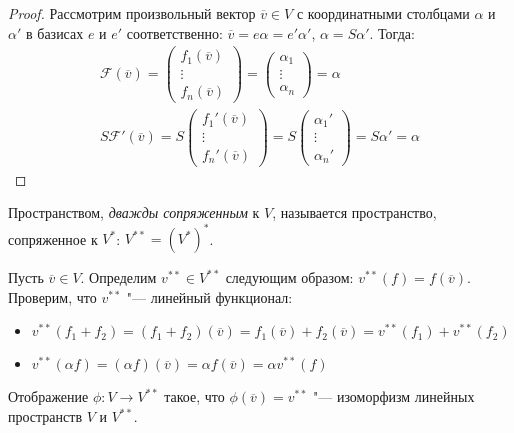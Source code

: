 \begin{proof}
	Рассмотрим произвольный вектор $\overline{v} \in V$ с координатными столбцами $\alpha$ и $\alpha'$ в базисах $e$ и $e'$ соответственно: $\overline{v} = e\alpha = e'\alpha'$, $\alpha = S\alpha'$. Тогда:
	\begin{gather*}
	\mathcal{F}(\overline{v}) = \begin{pmatrix}f_1(\overline{v})\\\vdots\\f_n(\overline{v})\end{pmatrix} = \begin{pmatrix}\alpha_1\\\vdots\\\alpha_n\end{pmatrix} = \alpha\\
	S\mathcal{F}'(\overline{v}) = S\begin{pmatrix}f_1'(\overline{v})\\\vdots\\f_n'(\overline{v})\end{pmatrix} = S\begin{pmatrix}\alpha_1'\\\vdots\\\alpha_n'\end{pmatrix} = S\alpha' = \alpha
	\end{gather*}
\end{proof}

\begin{definition}
	Пространством, \textit{дважды сопряженным} к $V$, называется пространство, сопряженное к $V^*$: $V^{**} = (V^*)^*$.
\end{definition}

\begin{example}
	Пусть $\overline{v} \in V$. Определим $v^{**} \in V^{**}$ следующим образом: $v^{**}(f) = f(\overline{v})$. Проверим, что $v^{**}$ "--- линейный функционал:
	\begin{itemize}
		\item $v^{**}(f_1 + f_2) = (f_1 + f_2)(\overline{v}) = f_1(\overline{v}) + f_2(\overline{v}) = v^{**}(f_1) + v^{**}(f_2)$
		\item $v^{**}(\alpha f) = (\alpha f)(\overline{v}) = \alpha f(\overline{v}) = \alpha v^{**}(f)$
	\end{itemize}
\end{example}

\begin{theorem}
	Отображение $\phi: V \rightarrow V^{**}$ такое, что $\phi(\overline{v}) = v^{**}$ "--- изоморфизм линейных пространств $V$ и $V^{**}$.
\end{theorem}

